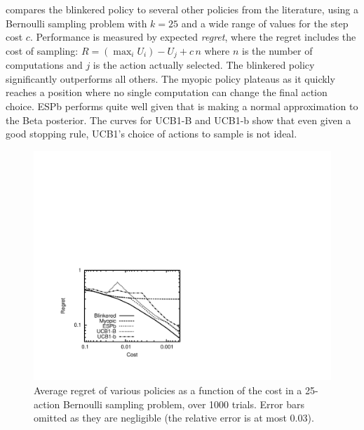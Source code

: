 compares the blinkered policy 
to several other policies from the literature, using a
Bernoulli sampling problem with $k=25$ and a wide range of values for the step cost $c$.
Performance is measured by expected {\em regret}, where the regret includes the cost of sampling:
$R = (\max_i U_i) - U_j + c\,n$
where $n$ is the number of computations and $j$ is the action actually selected.
The blinkered policy significantly outperforms all others.  The myopic policy
plateaus as it quickly reaches a position where no single computation can
change the final action choice.  ESPb performs quite well given
that is making a normal approximation to the Beta posterior.  
The curves for UCB1-B and UCB1-b show that even given a good stopping rule, UCB1's
choice of actions to sample is not ideal.


\begin{figure}[htb]
\centering
\includegraphics[scale=0.7, trim=90 70 400 300]{blinkered-regret.pdf}
\caption{Average regret of various policies as a function of the cost
in a 25-action Bernoulli sampling problem, over 1000 trials. Error bars
omitted as they are negligible (the relative error is at most 0.03).}
\label{fig:blinkered}
\end{figure}

